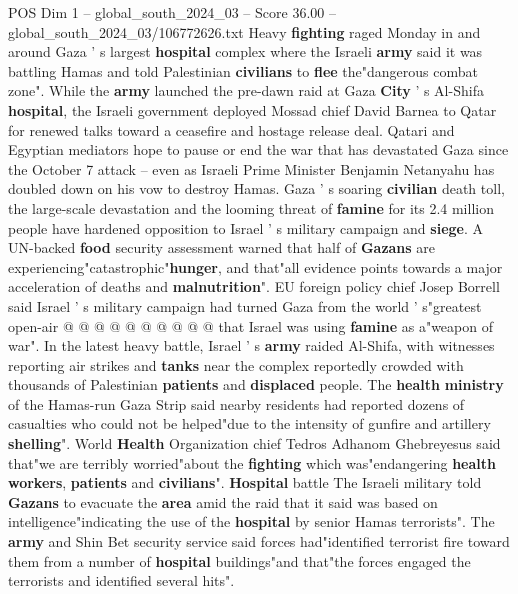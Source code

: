 \begin{textsample}{POS Dim 1 – global\_south\_2024\_03 – Score 36.00 – global\_south\_2024\_03/106772626.txt}  \label{ex:f1_pos_005}
Heavy \textbf{fighting} raged Monday in and around Gaza ' s largest \textbf{hospital} complex where the Israeli \textbf{army} said it was battling Hamas and told Palestinian \textbf{civilians} to \textbf{flee} the"dangerous combat zone".
While the \textbf{army} launched the pre-dawn raid at Gaza \textbf{City} ' s Al-Shifa \textbf{hospital}, the Israeli government deployed Mossad chief David Barnea to Qatar for renewed talks toward a ceasefire and hostage release deal.
Qatari and Egyptian mediators hope to pause or end the war that has devastated Gaza since the October 7 attack -- even as Israeli Prime Minister Benjamin Netanyahu has doubled down on his vow to destroy Hamas.
Gaza ' s soaring \textbf{civilian} death toll, the large-scale devastation and the looming threat of \textbf{famine} for its 2.4 million people have hardened opposition to Israel ' s military campaign and \textbf{siege}.
A UN-backed \textbf{food} security assessment warned that half of \textbf{Gazans} are experiencing"catastrophic"\textbf{hunger}, and that"all evidence points towards a major acceleration of deaths and \textbf{malnutrition}".
EU foreign policy chief Josep Borrell said Israel ' s military campaign had turned Gaza from the world ' s"greatest open-air @ @ @ @ @ @ @ @ @ @ that Israel was using \textbf{famine} as a"weapon of war".
In the latest heavy battle, Israel ' s \textbf{army} raided Al-Shifa, with witnesses reporting air strikes and \textbf{tanks} near the complex reportedly crowded with thousands of Palestinian \textbf{patients} and \textbf{displaced} people.
The \textbf{health} \textbf{ministry} of the Hamas-run Gaza Strip said nearby residents had reported dozens of casualties who could not be helped"due to the intensity of gunfire and artillery \textbf{shelling}".
World \textbf{Health} Organization chief Tedros Adhanom Ghebreyesus said that"we are terribly worried"about the \textbf{fighting} which was"endangering \textbf{health} \textbf{workers}, \textbf{patients} and \textbf{civilians}". \textbf{Hospital} battle The Israeli military told \textbf{Gazans} to evacuate the \textbf{area} amid the raid that it said was based on intelligence"indicating the use of the \textbf{hospital} by senior Hamas terrorists".
The \textbf{army} and Shin Bet security service said forces had"identified terrorist fire toward them from a number of \textbf{hospital} buildings"and that"the forces engaged the terrorists and identified several hits".

\end{textsample}
